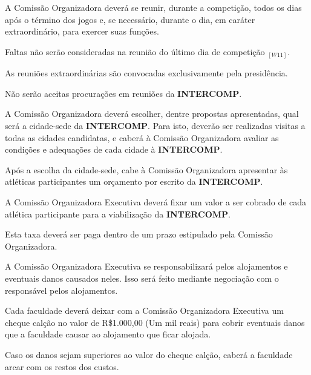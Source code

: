 \begin{article}
	A Comissão Organizadora deverá se reunir, durante a competição, todos os dias após o término dos jogos e, se necessário, durante o dia, em caráter extraordinário, para exercer suas funções.

	\begin{xparagraph}
		Faltas não serão consideradas na reunião do último dia de competição $_{[W11]}$.
	\end{xparagraph}

	\begin{xparagraph}
		As reuniões extraordinárias são convocadas exclusivamente pela presidência.
	\end{xparagraph}
\end{article}

\begin{article}
	Não serão aceitas procurações em reuniões da \textbf{INTERCOMP}.
\end{article}

\begin{article}
	A Comissão Organizadora deverá escolher, dentre propostas apresentadas, qual será a cidade-sede da \textbf{INTERCOMP}. Para isto, deverão ser realizadas visitas a todas as cidades candidatas, e caberá à Comissão Organizadora avaliar as condições e adequações de cada cidade à \textbf{INTERCOMP}.

	\begin{xparagraph}
		Após a escolha da cidade-sede, cabe à Comissão Organizadora apresentar às atléticas participantes um orçamento por escrito da \textbf{INTERCOMP}.
	\end{xparagraph}

	\begin{xparagraph}
		A Comissão Organizadora Executiva deverá fixar um valor a ser cobrado de cada atlética participante para a viabilização da \textbf{INTERCOMP}.
	\end{xparagraph}

	\begin{xparagraph}
		Esta taxa deverá ser paga dentro de um prazo estipulado pela Comissão Organizadora.
	\end{xparagraph}

	\begin{xparagraph}
		A Comissão Organizadora Executiva se responsabilizará pelos alojamentos e eventuais danos causados neles. Isso será feito mediante negociação com o responsável pelos alojamentos.
	\end{xparagraph}

	\begin{xparagraph}
		Cada faculdade deverá deixar com a Comissão Organizadora Executiva um cheque calção no valor de R\$1.000,00 (Um mil reais) para cobrir eventuais danos que a faculdade causar ao alojamento que ficar alojada.
	\end{xparagraph}

	\begin{xparagraph}
		Caso os danos sejam superiores ao valor do cheque calção, caberá a faculdade arcar com os restos dos custos.
	\end{xparagraph}
\end{article}


